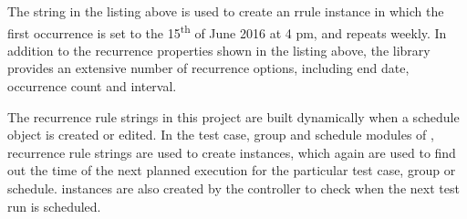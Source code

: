 \noindent The string in the listing above is used to create an rrule instance in which the first occurrence is set to the 15\textsuperscript{th} of June 2016 at 4 pm, and repeats weekly. In addition to the recurrence properties shown in the listing above, the library provides an extensive number of recurrence options, including end date, occurrence count and interval.


The recurrence rule strings in this project are built dynamically when a schedule object is created or edited. In the test case, group and schedule modules of \toolname, recurrence rule strings are used to create  instances, which again are used to find out the time of the next planned execution for the particular test case, group or schedule.  instances are also created by the controller to check when the next test run is scheduled.


